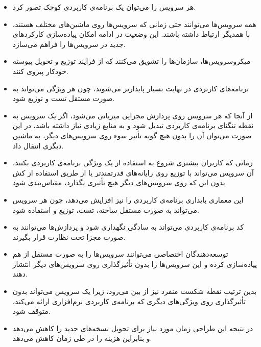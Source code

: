\begin{itemize}
	
	\item هر سرویس را می‌توان یک برنامه‌ی کاربردی کوچک تصور کرد.
	
	\item همه سرویس‌ها می‌توانند حتی زمانی که سرویس‌ها روی ماشین‌های مختلف هستند، با همدیگر ارتباط داشته باشند. این وضعیت در ادامه امکان پیاده‌سازی کارکردهای جدید در سرویس‌ها را فراهم می‌سازد.
	
	\item میکروسرویس‌ها، سازمان‌ها را تشویق می‌کنند که از فرایند توزیع و تحویل پیوسته خودکار پیروی کنند.
	
	\item برنامه‌های کاربردی‌ در نهایت بسیار پایدارتر می‌شوند، چون هر ویژگی می‌تواند به صورت مستقل تست و توزیع شود.
	
	\item از آنجا که هر سرویس روی پردازش مجزایی میزبانی می‌شود، اگر یک سرویس به نقطه تنگنای برنامه‌ی کاربردی تبدیل شود و به منابع زیادی نیاز داشته باشد، در این صورت می‌توان آن را بدون هیچ گونه تأثیر سوء روی سرویس‌های دیگر، به ماشین دیگری انتقال داد.
	
	\item زمانی که کاربران بیشتری شروع به استفاده از یک ویژگی برنامه‌ی کاربردی بکنند، آن سرویس می‌تواند با توزیع روی رایانه‌های قدرتمندتر یا از طریق استفاده از کش بدون این که روی سرویس‌های دیگر هیچ تأثیری بگذارد، مقیاس‌بندی شود.
	
	\item این معماری پایداری برنامه‌ی کاربردی را نیز افزایش می‌دهد، چون هر سرویس می‌تواند به صورت مستقل ساخته، تست، توزیع و استفاده شود.
	
	\item کد برنامه‌ی کاربردی می‌تواند به سادگی نگهداری شود و پردازش‌ها می‌توانند به صورت مجزا تحت نظارت قرار بگیرند.
	
	\item توسعه‌دهندگان اختصاصی می‌توانند سرویس‌ها را به صورت مستقل از هم پیاده‌سازی کرده و این سرویس‌ها را بدون تأثیرگذاری روی سرویس‌های دیگر انتشار دهند.
	
	\item بدین ترتیب نقطه شکست منفرد نیز از بین می‌رود، زیرا یک سرویس می‌تواند بدون تأثیرگذاری روی ویژگی‌های دیگری که برنامه‌ی کاربردی نرم‌افزاری ارائه می‌کند، متوقف شود.
	
	\item در نتیجه این طراحی زمان مورد نیاز برای تحویل نسخه‌های جدید را کاهش می‌دهد و بنابراین هزینه را در طی زمان کاهش می‌دهد.
	

\end{itemize}
